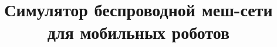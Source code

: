 \documentclass[%
]{article}
\begin{document}



\title{Симулятор беспроводной меш-сети для мобильных роботов}



\end{document}
